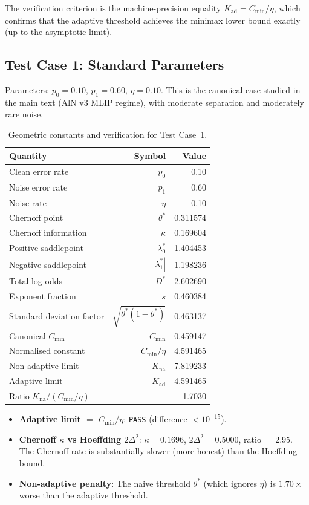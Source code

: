 \documentclass[article]{amsart}
\theoremstyle{definition}
\begin{document}
The verification criterion is the machine-precision equality $K_{\mathrm{ad}} = C_{\min}/\eta$, which confirms that the adaptive threshold achieves the minimax lower bound exactly (up to the asymptotic limit).

\subsection{Test Case 1: Standard Parameters}

Parameters: $p_0 = 0.10$, $p_1 = 0.60$, $\eta = 0.10$. This is the canonical case studied in the main text (AlN v3 MLIP regime), with moderate separation and moderately rare noise.

\begin{table}[htbp]
\centering
\caption{Geometric constants and verification for Test Case~1.}
\label{tab:case1}
\begin{tabular}{lrr}
\toprule
Quantity & Symbol & Value \\
\midrule
Clean error rate & $p_0$ & 0.10 \\
Noise error rate & $p_1$ & 0.60 \\
Noise rate & $\eta$ & 0.10 \\
Chernoff point & $\theta^*$ & 0.311574 \\
Chernoff information & $\kappa$ & 0.169604 \\
Positive saddlepoint & $\lambda_0^*$ & 1.404453 \\
Negative saddlepoint & $|\lambda_1^*|$ & 1.198236 \\
Total log-odds & $D^*$ & 2.602690 \\
Exponent fraction & $s$ & 0.460384 \\
Standard deviation factor & $\sqrt{\theta^*(1-\theta^*)}$ & 0.463137 \\
\midrule
Canonical $C_{\min}$ & $C_{\min}$ & 0.459147 \\
Normalised constant & $C_{\min}/\eta$ & 4.591465 \\
Non-adaptive limit & $K_{\mathrm{na}}$ & 7.819233 \\
Adaptive limit & $K_{\mathrm{ad}}$ & 4.591465 \\
Ratio $K_{\mathrm{na}} / (C_{\min}/\eta)$ & & 1.7030 \\
\bottomrule
\end{tabular}
\end{table}

\begin{itemize}
    \item\textbf{Adaptive limit $=$ $C_{\min}/\eta$}: \texttt{PASS} (difference $< 10^{-15}$).
    \item\textbf{Chernoff $\kappa$ vs Hoeffding $2\Delta^2$}: $\kappa = 0.1696$, $2\Delta^2 = 0.5000$, ratio $= 2.95$. The Chernoff rate is substantially slower (more honest) than the Hoeffding bound.
    \item\textbf{Non-adaptive penalty}: The naive threshold $\theta^*$ (which ignores $\eta$) is $1.70\times$ worse than the adaptive threshold.
\end{itemize}
\end{document}
